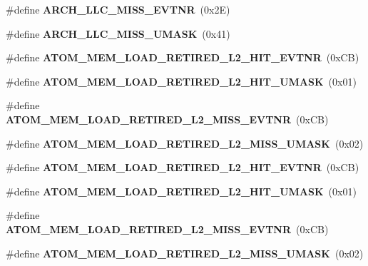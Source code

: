 \begin{DoxyCompactItemize}
\item 
\#define {\bfseries A\+R\+C\+H\+\_\+\+L\+L\+C\+\_\+\+M\+I\+S\+S\+\_\+\+E\+V\+T\+N\+R}~(0x2\+E)\label{types_8h_a557e0af84a53fe702dbf6c426f01a430}

\item 
\#define {\bfseries A\+R\+C\+H\+\_\+\+L\+L\+C\+\_\+\+M\+I\+S\+S\+\_\+\+U\+M\+A\+S\+K}~(0x41)\label{types_8h_a9844e9cf0b1be6e377394aa0f36c0cc9}

\item 
\#define {\bfseries A\+T\+O\+M\+\_\+\+M\+E\+M\+\_\+\+L\+O\+A\+D\+\_\+\+R\+E\+T\+I\+R\+E\+D\+\_\+\+L2\+\_\+\+H\+I\+T\+\_\+\+E\+V\+T\+N\+R}~(0x\+C\+B)\label{types_8h_ae22b6f56994cf7ace060db72ae78ed02}

\item 
\#define {\bfseries A\+T\+O\+M\+\_\+\+M\+E\+M\+\_\+\+L\+O\+A\+D\+\_\+\+R\+E\+T\+I\+R\+E\+D\+\_\+\+L2\+\_\+\+H\+I\+T\+\_\+\+U\+M\+A\+S\+K}~(0x01)\label{types_8h_a692622a84797600e7b04df9a1eacc475}

\item 
\#define {\bfseries A\+T\+O\+M\+\_\+\+M\+E\+M\+\_\+\+L\+O\+A\+D\+\_\+\+R\+E\+T\+I\+R\+E\+D\+\_\+\+L2\+\_\+\+M\+I\+S\+S\+\_\+\+E\+V\+T\+N\+R}~(0x\+C\+B)\label{types_8h_a3c0d272f11177100e9b18f3772efe0e2}

\item 
\#define {\bfseries A\+T\+O\+M\+\_\+\+M\+E\+M\+\_\+\+L\+O\+A\+D\+\_\+\+R\+E\+T\+I\+R\+E\+D\+\_\+\+L2\+\_\+\+M\+I\+S\+S\+\_\+\+U\+M\+A\+S\+K}~(0x02)\label{types_8h_a61f57e34652a6d1477797b48401801da}

\item 
\#define {\bfseries A\+T\+O\+M\+\_\+\+M\+E\+M\+\_\+\+L\+O\+A\+D\+\_\+\+R\+E\+T\+I\+R\+E\+D\+\_\+\+L2\+\_\+\+H\+I\+T\+\_\+\+E\+V\+T\+N\+R}~(0x\+C\+B)\label{types_8h_ae22b6f56994cf7ace060db72ae78ed02}

\item 
\#define {\bfseries A\+T\+O\+M\+\_\+\+M\+E\+M\+\_\+\+L\+O\+A\+D\+\_\+\+R\+E\+T\+I\+R\+E\+D\+\_\+\+L2\+\_\+\+H\+I\+T\+\_\+\+U\+M\+A\+S\+K}~(0x01)\label{types_8h_a692622a84797600e7b04df9a1eacc475}

\item 
\#define {\bfseries A\+T\+O\+M\+\_\+\+M\+E\+M\+\_\+\+L\+O\+A\+D\+\_\+\+R\+E\+T\+I\+R\+E\+D\+\_\+\+L2\+\_\+\+M\+I\+S\+S\+\_\+\+E\+V\+T\+N\+R}~(0x\+C\+B)\label{types_8h_a3c0d272f11177100e9b18f3772efe0e2}

\item 
\#define {\bfseries A\+T\+O\+M\+\_\+\+M\+E\+M\+\_\+\+L\+O\+A\+D\+\_\+\+R\+E\+T\+I\+R\+E\+D\+\_\+\+L2\+\_\+\+M\+I\+S\+S\+\_\+\+U\+M\+A\+S\+K}~(0x02)\label{types_8h_a61f57e34652a6d1477797b48401801da}


\end{DoxyCompactItemize}
